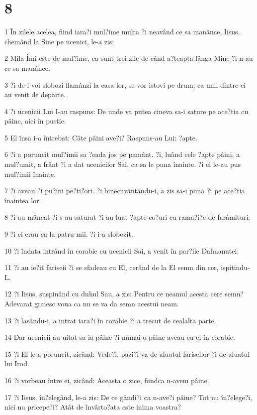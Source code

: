 \chapter{8}

\par 1 În zilele acelea, fiind iara?i mul?ime multa ?i neavând ce sa manânce, Iisus, chemând la Sine pe ucenici, le-a zis:
\par 2 Mila Îmi este de mul?ime, ca sunt trei zile de când a?teapta lânga Mine ?i n-au ce sa manânce.
\par 3 ?i de-i voi slobozi flamânzi la casa lor, se vor istovi pe drum, ca unii dintre ei au venit de departe.
\par 4 ?i ucenicii Lui I-au raspuns: De unde va putea cineva sa-i sature pe ace?tia cu pâine, aici în pustie.
\par 5 El însa i-a întrebat: Câte pâini ave?i? Raspuns-au Lui: ?apte.
\par 6 ?i a poruncit mul?imii sa ?eada jos pe pamânt. ?i, luând cele ?apte pâini, a mul?umit, a frânt ?i a dat ucenicilor Sai, ca sa le puna înainte. ?i ei le-au pus mul?imii înainte.
\par 7 ?i aveau ?i pu?ini pe?ti?ori. ?i binecuvântându-i, a zis sa-i puna ?i pe ace?tia înaintea lor.
\par 8 ?i au mâncat ?i s-au saturat ?i au luat ?apte co?uri cu rama?i?e de farâmituri.
\par 9 ?i ei erau ca la patru mii. ?i i-a slobozit.
\par 10 ?i îndata intrând în corabie cu ucenicii Sai, a venit în par?ile Dalmanutei.
\par 11 ?i au ie?it fariseii ?i se sfadeau cu El, cerând de la El semn din cer, ispitindu-L.
\par 12 ?i Iisus, suspinând cu duhul Sau, a zis: Pentru ce neamul acesta cere semn? Adevarat graiesc voua ca nu se va da semn acestui neam.
\par 13 ?i lasându-i, a intrat iara?i în corabie ?i a trecut de cealalta parte.
\par 14 Dar ucenicii au uitat sa ia pâine ?i numai o pâine aveau cu ei în corabie.
\par 15 ?i El le-a poruncit, zicând: Vede?i, pazi?i-va de aluatul fariseilor ?i de aluatul lui Irod.
\par 16 ?i vorbeau între ei, zicând: Aceasta o zice, fiindca n-avem pâine.
\par 17 ?i Iisus, în?elegând, le-a zis: De ce gândi?i ca n-ave?i pâine? Tot nu în?elege?i, nici nu pricepe?i? Atât de învârto?ata este inima voastra?
